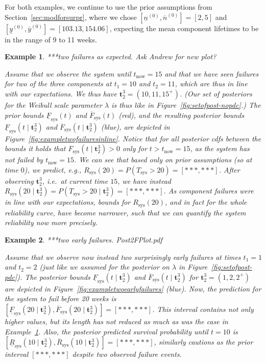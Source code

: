 \documentclass[12pt,a4paper,twocolumn,fleqn]{narms}
\renewcommand{\vec}[1]{{\bm#1}}
\newcommand{\uz}{^{(0)}} %
\newcommand{\ul}[1]{\underline{#1}}
\newcommand{\ol}[1]{\overline{#1}}
\newcommand{\Rsys}{R_\text{sys}}
\newcommand{\lRsys}{\ul{R}_\text{sys}}
\newcommand{\uRsys}{\ol{R}_\text{sys}}
\newcommand{\Fsys}{F_\text{sys}}
\newcommand{\lFsys}{\ul{F}_\text{sys}}
\newcommand{\uFsys}{\ol{F}_\text{sys}}
\def\yzl{\ul{y}\uz}
\def\yzu{\ol{y}\uz}
\def\nzl{\ul{n}\uz}
\def\nzu{\ol{n}\uz}
\newtheorem{example}{Example}
\begin{document}
For both examples, we continue to use the prior assumptions from Section~\ref{sec:modforsurpr},
where we chose $[\nzl, \nzu] = [2,5]$ and $[\yzl, \yzu] = [103.13, 154.06]$,
expecting the mean component lifetimes to be in the range of 9 to 11 weeks.

\begin{example}
\label{ex:1}
***two failures as expected. Ask Andrew for new plot?

Assume that we observe the system until $t_\text{now} = 15$
and that we have seen failures for two of the three components
at $t_1=10$ and $t_2=11$, which are thus in line with our expectations.
We thus have $\vec{t}_2^3 = (10, 11, 15^+)$.
(Our set of posteriors for the Weibull scale parameter $\lambda$ is thus like in Figure~\ref{fig:setofpost-nopdc}.)
The prior bounds $\lFsys(t)$ and $\uFsys(t)$ (red),
and the resulting posterior bounds $\lFsys(t \mid \vec{t}_2^3)$ and $\uFsys(t \mid \vec{t}_2^3)$ (blue),  
are depicted in Figure~\ref{fig:exampletwofailuresinline}.
Notice that for all posterior cdfs between the bounds
it holds that $\Fsys(t \mid \vec{t}_2^3) > 0$ only for $t > t_\text{now} = 15$,
as the system has not failed by $t_\text{now} = 15$.
We can see that based only on prior assumptions (so at time $0$),
we predict, e.g., $\Rsys(20) = P(T_\text{sys} > 20) = [***, ***]$.
After observing $\vec{t}_2^3$, i.e.\ at current time $15$,
we have instead $\Rsys(20 \mid \vec{t}_2^3) = P(T_\text{sys} > 20 \mid \vec{t}_2^3) = [***, ***]$.
As component failures were in line with our expectations,
bounds for $\Rsys(20)$, and in fact for the whole reliability curve, 
have become narrower,
such that we can quantify the system reliability now more precisely.
\end{example}

\begin{example}
\label{ex:2}
***two early failures. Post2FPlot.pdf

Assume that we observe now instead two surprisingly early failures at times $t_1 = 1$ and $t_2 = 2$
(just like we assumed for the posterior on $\lambda$ in Figure~\ref{fig:setofpost-pdc}).
The posterior bounds $\lFsys(t \mid \vec{t}_2^3)$ and $\uFsys(t \mid \vec{t}_2^3)$
for $\vec{t}_2^3 = (1, 2, 2^+)$ 
are depicted in Figure~\ref{fig:exampletwoearlyfailures} (blue).
Now, the prediction for the system to fail before 20 weeks
is $[\lFsys(20 \mid \vec{t}_2^3), \uFsys(20 \mid \vec{t}_2^3)] = [***,***]$.
This interval contains not only higher values,
but its length has not reduced as much as was the case in Example~\ref{ex:1}.
Also, the posterior predicted survival probability until $t=10$
is $[\lRsys(10 \mid \vec{t}_2^3), \uRsys(10 \mid \vec{t}_2^3)] = [***,***]$,
similarly cautions as the prior interval $[***,***]$
despite two observed failure events. 
\end{example}
\end{document}
